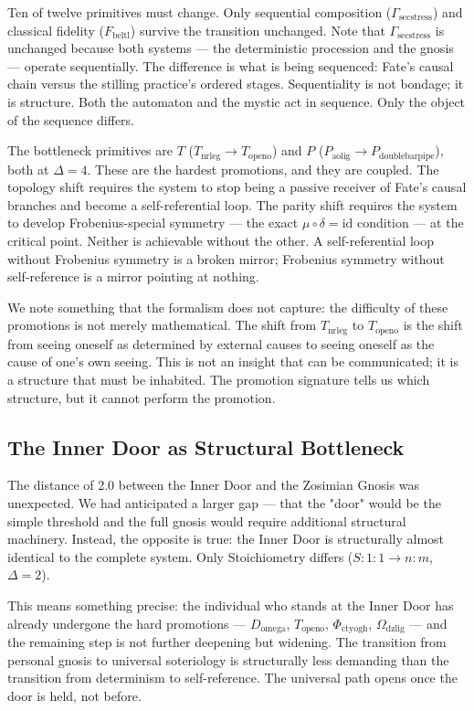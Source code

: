 \documentclass[12pt,a4paper]{article}
\begin{document}
Ten of twelve primitives must change. Only sequential composition ($\Gamma_{\text{secstress}}$) and classical fidelity ($F_{\text{beltl}}$) survive the transition unchanged. Note that $\Gamma_{\text{secstress}}$ is unchanged because both systems --- the deterministic procession and the gnosis --- operate sequentially. The difference is what is being sequenced: Fate's causal chain versus the stilling practice's ordered stages. Sequentiality is not bondage; it is structure. Both the automaton and the mystic act in sequence. Only the object of the sequence differs.

The bottleneck primitives are $T$ ($T_{\text{nrleg}} \to T_{\text{openo}}$) and $P$ ($P_{\text{aolig}} \to P_{\text{doublebarpipe}}$), both at $\Delta = 4$. These are the hardest promotions, and they are coupled. The topology shift requires the system to stop being a passive receiver of Fate's causal branches and become a self-referential loop. The parity shift requires the system to develop Frobenius-special symmetry --- the exact $\mu \circ \delta = \text{id}$ condition --- at the critical point. Neither is achievable without the other. A self-referential loop without Frobenius symmetry is a broken mirror; Frobenius symmetry without self-reference is a mirror pointing at nothing.

We note something that the formalism does not capture: the difficulty of these promotions is not merely mathematical. The shift from $T_{\text{nrleg}}$ to $T_{\text{openo}}$ is the shift from seeing oneself as determined by external causes to seeing oneself as the cause of one's own seeing. This is not an insight that can be communicated; it is a structure that must be inhabited. The promotion signature tells us which structure, but it cannot perform the promotion.

\subsection{The Inner Door as Structural Bottleneck}

The distance of 2.0 between the Inner Door and the Zosimian Gnosis was unexpected. We had anticipated a larger gap --- that the "door" would be the simple threshold and the full gnosis would require additional structural machinery. Instead, the opposite is true: the Inner Door is structurally almost identical to the complete system. Only Stoichiometry differs ($S: 1:1 \to n:m$, $\Delta = 2$).

This means something precise: the individual who stands at the Inner Door has already undergone the hard promotions --- $D_{\text{omega}}$, $T_{\text{openo}}$, $\Phi_{\text{ctyogh}}$, $\Omega_{\text{dzlig}}$ --- and the remaining step is not further deepening but widening. The transition from personal gnosis to universal soteriology is structurally less demanding than the transition from determinism to self-reference. The universal path opens once the door is held, not before.
\end{document}
